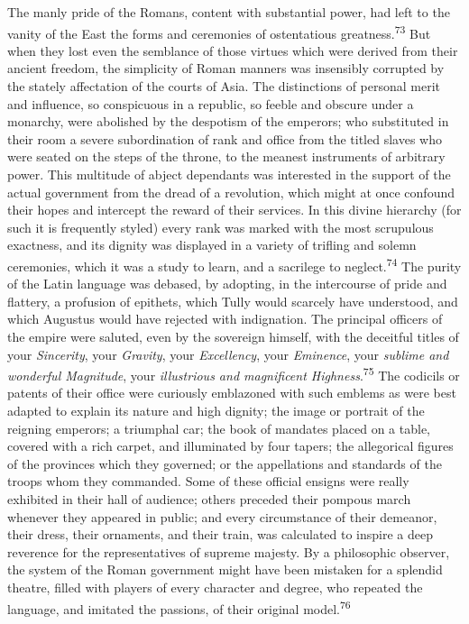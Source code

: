 The manly pride of the Romans, content with substantial power,
had left to the vanity of the East the forms and ceremonies of
ostentatious greatness.\textsuperscript{73} But when they lost even the semblance
of those virtues which were derived from their ancient freedom,
the simplicity of Roman manners was insensibly corrupted by the
stately affectation of the courts of Asia. The distinctions of
personal merit and influence, so conspicuous in a republic, so
feeble and obscure under a monarchy, were abolished by the
despotism of the emperors; who substituted in their room a severe
subordination of rank and office from the titled slaves who were
seated on the steps of the throne, to the meanest instruments of
arbitrary power. This multitude of abject dependants was
interested in the support of the actual government from the dread
of a revolution, which might at once confound their hopes and
intercept the reward of their services. In this divine hierarchy
(for such it is frequently styled) every rank was marked with the
most scrupulous exactness, and its dignity was displayed in a
variety of trifling and solemn ceremonies, which it was a study
to learn, and a sacrilege to neglect.\textsuperscript{74} The purity of the Latin
language was debased, by adopting, in the intercourse of pride
and flattery, a profusion of epithets, which Tully would scarcely
have understood, and which Augustus would have rejected with
indignation. The principal officers of the empire were saluted,
even by the sovereign himself, with the deceitful titles of your
\textit{Sincerity}, your \textit{Gravity}, your \textit{Excellency}, your \textit{Eminence},
your \textit{sublime and wonderful Magnitude}, your \textit{illustrious and
magnificent Highness}.\textsuperscript{75} The codicils or patents of their office
were curiously emblazoned with such emblems as were best adapted
to explain its nature and high dignity; the image or portrait of
the reigning emperors; a triumphal car; the book of mandates
placed on a table, covered with a rich carpet, and illuminated by
four tapers; the allegorical figures of the provinces which they
governed; or the appellations and standards of the troops whom
they commanded. Some of these official ensigns were really
exhibited in their hall of audience; others preceded their
pompous march whenever they appeared in public; and every
circumstance of their demeanor, their dress, their ornaments, and
their train, was calculated to inspire a deep reverence for the
representatives of supreme majesty. By a philosophic observer,
the system of the Roman government might have been mistaken for a
splendid theatre, filled with players of every character and
degree, who repeated the language, and imitated the passions, of
their original model.\textsuperscript{76}

